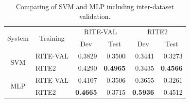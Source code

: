 \documentclass[12pt]{article}
\begin{document}
\begin{CJK*}{UTF8}{bkai}
\begin{spacing}{1.77}
\begin{table}[H]
  \centering
  \setlength{\extrarowheight}{-3pt}
  \caption{Comparing of SVM and MLP including inter-dataset validation.}
  \label{result:ml_original}
  \begin{tabular}{|c|l|r|r|r|r|}
  \hline
  \multirow{2}{*}{System} & \multicolumn{1}{c|}{\multirow{2}{*}{Training}} & \multicolumn{2}{c|}{RITE-VAL} & \multicolumn{2}{c|}{RITE2} \\ \cline{3-6}
   & \multicolumn{1}{c|}{} & \multicolumn{1}{c|}{Dev} & \multicolumn{1}{c|}{Test} & \multicolumn{1}{c|}{Dev} & \multicolumn{1}{c|}{Test} \\ \hline
  \multirow{2}{*}{SVM} & RITE-VAL & 0.3829 & 0.3500 & 0.3441 & 0.3273 \\ \cline{2-6}
   & RITE2 & 0.4290 & \textbf{0.4965} & 0.3435 & \textbf{0.4566} \\ \hline
  \multirow{2}{*}{MLP} & RITE-VAL & 0.4107 & 0.3506 & 0.3655 & 0.3261 \\ \cline{2-6}
   & RITE2 & \textbf{0.4665} & 0.3715 & \textbf{0.5936} & 0.4512 \\ \hline
  \end{tabular}
\end{table}


\end{spacing}
\end{CJK*}
\end{document}
